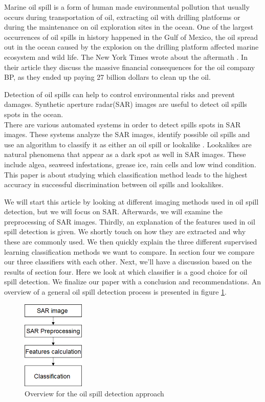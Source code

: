 Marine oil spill is a form of human made environmental pollution that usually occurs during transportation of oil, extracting oil with drilling platforms \cite{Zhang201476} or during the maintenance on oil exploration sites in the ocean. One of the largest occurrences of oil spills in history happened in the Gulf of Mexico, the oil spread out in the ocean caused by the explosion on the drilling platform affected marine ecosystem and wild life\cite{Bozeman2011244}. The New York Times wrote about the aftermath \cite{bpnytimes}. In their article they discuss the massive financial consequences for the oil company BP, as they ended up paying 27 billion dollars to clean up the oil.

Detection of oil spills can help to control environmental risks and prevent damages. Synthetic aperture radar(SAR) images are useful to detect oil spills spots in the ocean. \\
There are various automated systems in order to detect spills spots in SAR images. These systems analyze the SAR images, identify possible oil spills and use an algorithm to classify it as either an oil spill or lookalike \cite{Xu201414,brekke2008classifiers,Keramitsoglou2006640,Guo2014146}. Lookalikes are natural phenomena that appear as a dark spot as well in SAR images. These include algea, seaweed infestations, grease ice, rain cells and low wind condition. This paper is about studying which classification method leads to the highest accuracy in successful discrimination between oil spills and lookalikes.

We will start this article by looking at different imaging methods used in oil spill detection, but we will focus on SAR. Afterwards, we will examine the preprocessing of SAR images. Thirdly, an explanation of the features used in oil spill detection is given. We shortly touch on how they are extracted and why these are commonly used. We then quickly explain the three different supervised learning classification methods we want to compare. In section four we compare our three classifiers with each other. Next, we'll have a discussion based on the results of section four. Here we look at which classifier is a good choice for oil spill detection. We finalize our paper with a conclusion and recommendations. An overview of a general oil spill detection process is presented in figure \ref{fig:overview}.

\begin{figure}[H]
	\centering
    \includegraphics[width=30mm,scale=0.2]{./img/basicsteps.png}
    \caption{\footnotesize{Overview for the oil spill detection approach}}
    \label{fig:overview}
\end{figure}